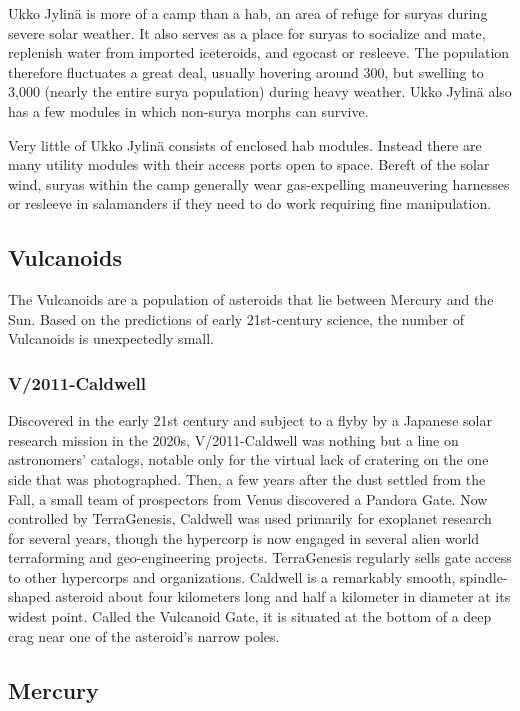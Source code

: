 Ukko Jylinä is more of a camp than a hab, an area 
of refuge for suryas during severe solar weather. It 
also serves as a place for suryas to socialize and mate, 
replenish water from imported iceteroids, and egocast 
or resleeve. The population therefore fluctuates  a 
great deal, usually hovering around 300, but swelling 
to 3,000 (nearly the entire surya population) during 
heavy weather. Ukko Jylinä also has a few modules in 
which non-surya morphs can survive.

Very little of Ukko Jylinä consists of enclosed hab 
modules. Instead there are many utility modules with 
their access ports open to space. Bereft of the solar 
wind, suryas within the camp generally wear gas-expelling maneuvering harnesses or resleeve in salamanders 
if they need to do work requiring fine manipulation.

\subsection{Vulcanoids}

The Vulcanoids are a population of asteroids that lie 
between Mercury and the Sun. Based on the predictions of early 21st-century science, the number of 
Vulcanoids is unexpectedly small.

\subsubsection{V/2011-Caldwell}

Discovered in the early 21st century and subject to 
a flyby by a Japanese solar research mission in the 
2020s, V/2011-Caldwell was nothing but a line on astronomers' catalogs, notable only for the virtual lack 
of cratering on the one side that was photographed. 
Then, a few years after the dust settled from the Fall, 
a small team of prospectors from Venus discovered 
a Pandora Gate. Now controlled by TerraGenesis, 
Caldwell was used primarily for exoplanet research 
for several years, though the hypercorp is now 
engaged in several alien world terraforming and 
geo-engineering projects. TerraGenesis regularly sells 
gate access to other hypercorps and organizations. 
Caldwell is a remarkably smooth, spindle-shaped asteroid about four kilometers long and half a kilometer 
in diameter at its widest point. Called the Vulcanoid 
Gate, it is situated at the bottom of a deep crag near 
one of the asteroid's narrow poles.

\subsection{Mercury}

